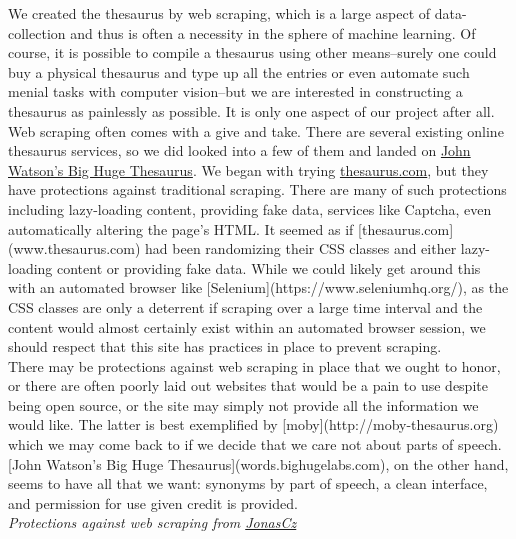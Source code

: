 \documentclass[12pt]{article}
\begin{document}
We created the thesaurus by web scraping, which is a large aspect of data-collection and thus is often a necessity in the sphere of machine learning. Of course, it is possible to compile a thesaurus using other means--surely one could buy a physical thesaurus and type up all the entries or even automate such menial tasks with computer vision--but we are interested in constructing a thesaurus as painlessly as possible. It is only one aspect of our project after all.\\
Web scraping often comes with a give and take. There are several existing online thesaurus services, so we did looked into a few of them and landed on \href{words.bighugelabs.com}{John Watson's Big Huge Thesaurus}. We began with trying \href{www.thesaurus.com}{thesaurus.com}, but they have protections against traditional scraping. There are many of such protections including lazy-loading content, providing fake data, services like Captcha, even automatically altering the page's HTML. It seemed as if [thesaurus.com](www.thesaurus.com) had been randomizing their CSS classes and either lazy-loading content or providing fake data. While we could likely get around this with an automated browser like [Selenium](https://www.seleniumhq.org/), as the CSS classes are only a deterrent if scraping over a large time interval and the content would almost certainly exist within an automated browser session, we should respect that this site has practices in place to prevent scraping.\\
There may be protections against web scraping in place that we ought to honor, or there are often poorly laid out websites that would be a pain to use despite being open source, or the site may simply not provide all the information we would like. The latter is best exemplified by [moby](http://moby-thesaurus.org) which we may come back to if we decide that we care not about parts of speech. [John Watson's Big Huge Thesaurus](words.bighugelabs.com), on the other hand, seems to have all that we want: synonyms by part of speech, a clean interface, and permission for use given credit is provided.\\
\textit{Protections against web scraping from \href{https://github.com/JonasCz/How-To-Prevent-Scraping/blob/master/README.md}{JonasCz}}\\
\end{document}
